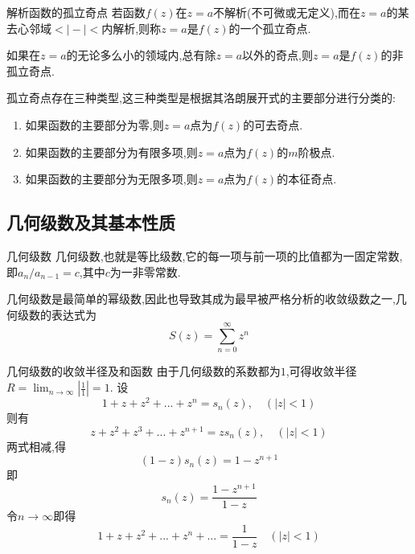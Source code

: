\documentclass[zihao=-4,a4paper]{ctexart}
\begin{document}
\begin{mdefinition}{解析函数的孤立奇点}
	若函数${f} \left( {z} \right)$在$ {z} = {a} $不解析(不可微或无定义),而在${z} = {a}$的某去心邻域$ {} < \left| {} - {} \right| < {} $内解析,则称$ {z} = {a} $是${f} \left( {z} \right)$的一个孤立奇点.

	如果在$ {z} = {a} $的无论多么小的领域内,总有除$ {z} = {a} $以外的奇点,则$ {z} = {a} $是${f} \left( {z} \right)$的非孤立奇点.

	孤立奇点存在三种类型,这三种类型是根据其洛朗展开式的主要部分进行分类的:
	\begin{enumerate}
		\item 如果函数的主要部分为零,则$ {z} = {a} $点为${f} \left( {z} \right)$的可去奇点.
		\item 如果函数的主要部分为有限多项,则$ {z} = {a} $点为${f} \left( {z} \right)$的$m$阶极点.
		\item 如果函数的主要部分为无限多项,则$ {z} = {a} $点为${f} \left( {z} \right)$的本征奇点.
	\end{enumerate}
\end{mdefinition}

\subsection{几何级数及其基本性质}

\begin{mdefinition}{几何级数}
	几何级数,也就是等比级数,它的每一项与前一项的比值都为一固定常数,即${a}_{n}/{a}_{n-1}=c$,其中$c$为一非零常数.

	几何级数是最简单的幂级数,因此也导致其成为最早被严格分析的收敛级数之一,几何级数的表达式为
	\begin{equation}
		S\left( {z} \right) = \sum^{\infty}_{n=0} {z}^{n}
	\end{equation}
\end{mdefinition}

\begin{mproof}{几何级数的收敛半径及和函数}
	由于几何级数的系数都为$1$,可得收敛半径$R = \lim_{n {\to} {\infty}} \left| \frac{1}{1} \right| = 1$.
	设
	\begin{equation*}
	1 + {z} + {z}^{2} + ... + {z}^{n} = {s}_{n} \left( {z} \right) , {\quad} \left( {\left| {z} \right|} < 1 \right)
	\end{equation*}
	则有
	\begin{equation*}
	{z} + {z}^{2} + {z}^{3} +... + {z}^{n+1} = {z} {s}_{n} \left( {z} \right) , {\quad} \left( {\left| {z} \right|} < 1 \right)
	\end{equation*}
	两式相减,得
	\begin{equation*}
	\left( 1 - {z} \right) {s}_{n} \left( {z} \right) = 1 - {z}^{n+1}
	\end{equation*}
	即
	\begin{equation*}
	{s}_{n} \left( {z} \right) = \frac{1 - {z}^{n+1}}{1 - {z}}
	\end{equation*}
	令${n} {\to} {\infty}$即得
	\begin{equation*}
	1 + {z} + {z}^{2} + ... + {z}^{n} + ... = \frac{1}{1 - {z}} {\quad} \left( {\left| {z} \right|} < 1 \right)
	\end{equation*}
\end{mproof}
\end{document}

